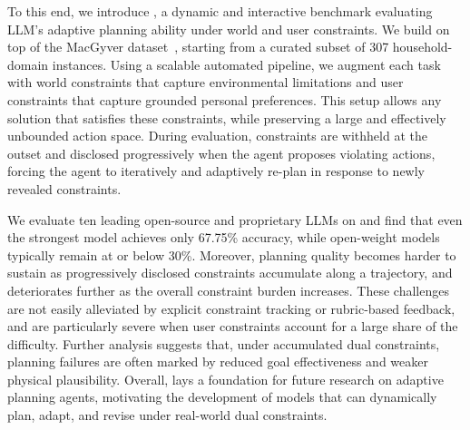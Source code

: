 To this end, we introduce \BENCH{}, a dynamic and interactive benchmark evaluating LLM's adaptive planning ability under world and user constraints. 
We build \bench{} on top of the MacGyver dataset~\citep{MacGyver}, starting from a curated subset of 307 household-domain instances.
Using a scalable automated pipeline, we augment each task with world constraints that capture environmental limitations and user constraints that capture grounded personal preferences.
This setup allows any solution that satisfies these constraints, while preserving a large and effectively unbounded action space.
During evaluation, constraints are withheld at the outset and disclosed progressively when the agent proposes violating actions, forcing the agent to iteratively and adaptively re-plan in response to newly revealed constraints.

We evaluate ten leading open-source and proprietary LLMs on \bench{} and find that even the strongest model achieves only 67.75\% accuracy, while open-weight models typically remain at or below 30\%.
Moreover, planning quality becomes harder to sustain as progressively disclosed constraints accumulate along a trajectory, and deteriorates further as the overall constraint burden increases.
These challenges are not easily alleviated by explicit constraint tracking or rubric-based feedback, and are particularly severe when user constraints account for a large share of the difficulty.
Further analysis suggests that, under accumulated dual constraints, planning failures are often marked by reduced goal effectiveness and weaker physical plausibility.
Overall, \bench{} lays a foundation for future research on adaptive planning agents, motivating the development of models that can dynamically plan, adapt, and revise under real-world dual constraints.


